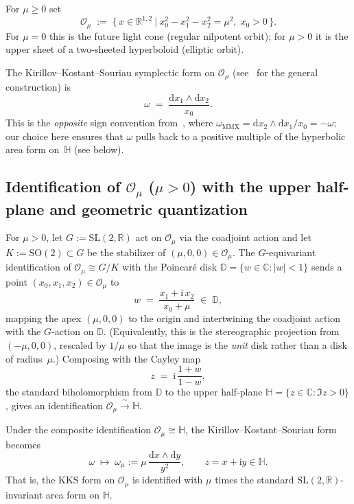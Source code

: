 \documentclass[11pt]{article}
\theoremstyle{plain}
\theoremstyle{definition}
\theoremstyle{remark}
\newcommand{\R}{\mathbb{R}}
\newcommand{\C}{\mathbb{C}}
\newcommand{\HH}{\mathbb{H}}
\newcommand{\SL}{\mathrm{SL}}
\newcommand{\SO}{\mathrm{SO}}
\newcommand{\OO}{\mathcal{O}}
\newcommand{\DD}{\mathbb{D}}
\newcommand{\ii}{\mathrm{i}}
\begin{document}
For $\mu\ge 0$ set
\[
  \OO_{\mu}\;:=\;\bigl\{\,x\in\R^{1,2}\ \big|\ x_{0}^{2}-x_{1}^{2}-x_{2}^{2}=\mu^{2},\;x_{0}>0\,\bigr\}.
\]
For $\mu=0$ this is the future light cone (regular nilpotent orbit); for $\mu>0$
it is the upper sheet of a two-sheeted hyperboloid (elliptic orbit).

The Kirillov--Kostant--Souriau symplectic form on $\OO_{\mu}$
(see~\cite[Ch.~1]{Kirillov2004} for the general construction) is
\[
  \omega\;=\;\frac{\mathrm{d}x_{1}\wedge \mathrm{d}x_{2}}{x_{0}}.
\]
This is the \emph{opposite} sign convention from~\cite{MMX2025}, where
$\omega_{\text{MMX}}=\mathrm{d}x_{2}\wedge\mathrm{d}x_{1}/x_{0}=-\omega$;
our choice here ensures that $\omega$ pulls back to a positive multiple of the
hyperbolic area form on~$\HH$ (see below). 

\subsection{Identification of \texorpdfstring{$\OO_{\mu}$}{O\_mu} (\texorpdfstring{$\mu>0$}{mu>0}) with the upper half-plane
  and geometric quantization}

For $\mu>0$, let $G:=\SL(2,\R)$ act on $\OO_{\mu}$ via the coadjoint action and let
$K:=\SO(2)\subset G$ be the stabilizer of $(\mu,0,0)\in\OO_{\mu}$.
The $G$-equivariant identification of $\OO_{\mu}\cong G/K$ with the
Poincar\'e disk $\DD=\{w\in\C:|w|<1\}$ sends a point
$(x_{0},x_{1},x_{2})\in\OO_{\mu}$ to
\[
  w\;=\;\frac{x_{1}+\ii\,x_{2}}{x_{0}+\mu}\;\in\;\DD,
\]
mapping the apex $(\mu,0,0)$ to the origin and intertwining the coadjoint
action with the $G$-action on $\DD$.
(Equivalently, this is the stereographic projection from $(-\mu,0,0)$,
rescaled by $1/\mu$ so that the image is the \emph{unit} disk rather than
a disk of radius~$\mu$.)
Composing with the Cayley map
\[
  z\;=\;\ii\,\frac{1+w}{1-w},
\]
the standard biholomorphism from $\DD$ to the upper
half-plane $\HH=\{z\in\C:\Im z>0\}$, gives an identification
$\OO_{\mu}\xrightarrow{\;\sim\;}\HH$.

Under the composite identification $\OO_{\mu}\cong\HH$, the
Kirillov--Kostant--Souriau form becomes
\[
  \omega\;\longmapsto\;
  \omega_{\mu}:=\mu\,\frac{\mathrm{d}x\wedge\mathrm{d}y}{y^{2}},
  \qquad z=x+\ii y\in\HH.
\]
That is, the KKS form on $\OO_{\mu}$ is identified with $\mu$ times the standard
$\SL(2,\R)$-invariant area form on $\HH$.
\end{document}
